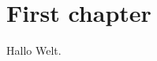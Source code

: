 \documentclass[../ana2u.tex]{subfiles}
\begin{document}
\setcounter{section}{0}

\section{First chapter}

Hallo Welt.
\end{document}
